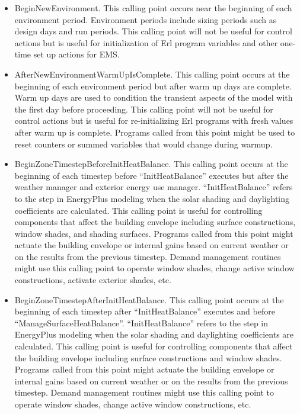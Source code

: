 \begin{itemize}
\item
  BeginNewEnvironment. This calling point occurs near the beginning of each environment period. Environment periods include sizing periods such as design days and run periods. This calling point will not be useful for control actions but is useful for initialization of Erl program variables and other one-time set up actions for EMS.
\item
  AfterNewEnvironmentWarmUpIsComplete. This calling point occurs at the beginning of each environment period but after warm up days are complete. Warm up days are used to condition the transient aspects of the model with the first day before proceeding. This calling point will not be useful for control actions but is useful for re-initializing Erl programs with fresh values after warm up is complete. Programs called from this point might be used to reset counters or summed variables that would change during warmup.
\item
  BeginZoneTimestepBeforeInitHeatBalance. This calling point occurs at the beginning of each timestep before ``InitHeatBalance'' executes but after the weather manager and exterior energy use manager. ``InitHeatBalance'' refers to the step in EnergyPlus modeling when the solar shading and daylighting coefficients are calculated. This calling point is useful for controlling components that affect the building envelope including surface constructions, window shades, and shading surfaces. Programs called from this point might actuate the building envelope or internal gains based on current weather or on the results from the previous timestep. Demand management routines might use this calling point to operate window shades, change active window constructions, activate exterior shades, etc.

\item
  BeginZoneTimestepAfterInitHeatBalance. This calling point occurs at the beginning of each timestep after ``InitHeatBalance'' executes and before ``ManageSurfaceHeatBalance''. ``InitHeatBalance'' refers to the step in EnergyPlus modeling when the solar shading and daylighting coefficients are calculated. This calling point is useful for controlling components that affect the building envelope including surface constructions and window shades. Programs called from this point might actuate the building envelope or internal gains based on current weather or on the results from the previous timestep. Demand management routines might use this calling point to operate window shades, change active window constructions, etc.


\end{itemize}
